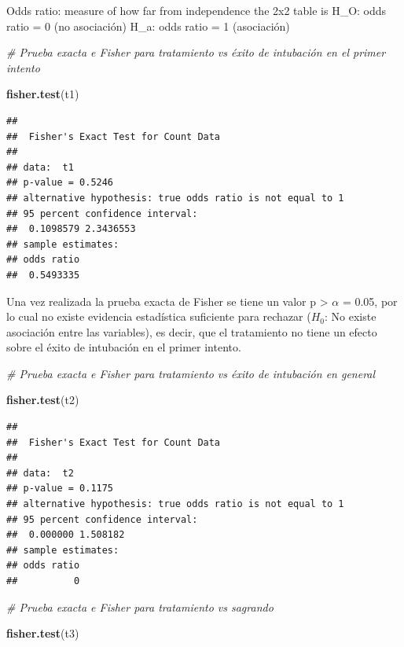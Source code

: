 \documentclass[
]{article}
\newenvironment{Shaded}{\begin{snugshade}}{\end{snugshade}}
\newcommand{\CommentTok}[1]{\textcolor[rgb]{0.56,0.35,0.01}{\textit{#1}}}
\newcommand{\FunctionTok}[1]{\textcolor[rgb]{0.13,0.29,0.53}{\textbf{#1}}}
\newcommand{\NormalTok}[1]{#1}
\begin{document}
Odds ratio: measure of how far from independence the 2x2 table is H\_O:
odds ratio = 0 (no asociación) H\_a: odds ratio = 1 (asociación)

\begin{Shaded}
\begin{Highlighting}[]
\CommentTok{\# Prueba exacta e Fisher para tratamiento vs éxito de intubación en el primer intento}

\FunctionTok{fisher.test}\NormalTok{(t1)}
\end{Highlighting}
\end{Shaded}

\begin{verbatim}
## 
##  Fisher's Exact Test for Count Data
## 
## data:  t1
## p-value = 0.5246
## alternative hypothesis: true odds ratio is not equal to 1
## 95 percent confidence interval:
##  0.1098579 2.3436553
## sample estimates:
## odds ratio 
##  0.5493335
\end{verbatim}

Una vez realizada la prueba exacta de Fisher se tiene un valor p
\textgreater{} \(\alpha\) = 0.05, por lo cual no existe evidencia
estadística suficiente para rechazar (\(H_0\): No existe asociación
entre las variables), es decir, que el tratamiento no tiene un efecto
sobre el éxito de intubación en el primer intento.

\begin{Shaded}
\begin{Highlighting}[]
\CommentTok{\# Prueba exacta e Fisher para tratamiento vs éxito de intubación en general}

\FunctionTok{fisher.test}\NormalTok{(t2)}
\end{Highlighting}
\end{Shaded}

\begin{verbatim}
## 
##  Fisher's Exact Test for Count Data
## 
## data:  t2
## p-value = 0.1175
## alternative hypothesis: true odds ratio is not equal to 1
## 95 percent confidence interval:
##  0.000000 1.508182
## sample estimates:
## odds ratio 
##          0
\end{verbatim}

\begin{Shaded}
\begin{Highlighting}[]
\CommentTok{\# Prueba exacta e Fisher para tratamiento vs sagrando}

\FunctionTok{fisher.test}\NormalTok{(t3)}
\end{Highlighting}
\end{Shaded}
\end{document}
